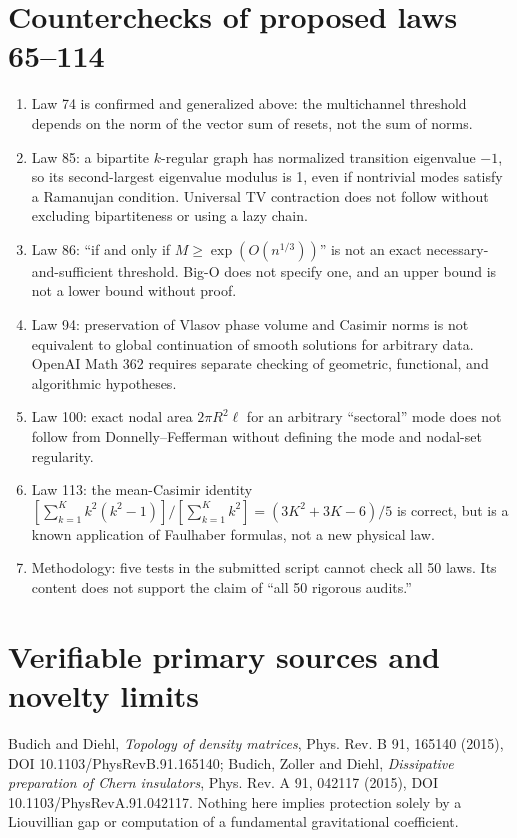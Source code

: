 \documentclass[11pt,a4paper,oneside]{book}
\begin{document}
\section{Counterchecks of proposed laws 65--114}
\begin{enumerate}
\item Law 74 is confirmed and generalized above: the multichannel threshold depends on the norm of the vector sum of resets, not the sum of norms.
\item Law 85: a bipartite $k$-regular graph has normalized transition eigenvalue $-1$, so its second-largest eigenvalue modulus is 1, even if nontrivial modes satisfy a Ramanujan condition. Universal TV contraction does not follow without excluding bipartiteness or using a lazy chain.
\item Law 86: ``if and only if $M\ge\exp(O(n^{1/3}))$'' is not an exact necessary-and-sufficient threshold. Big-O does not specify one, and an upper bound is not a lower bound without proof.
\item Law 94: preservation of Vlasov phase volume and Casimir norms is not equivalent to global continuation of smooth solutions for arbitrary data. OpenAI Math 362 requires separate checking of geometric, functional, and algorithmic hypotheses.
\item Law 100: exact nodal area $2\pi R^2\ell$ for an arbitrary ``sectoral'' mode does not follow from Donnelly--Fefferman without defining the mode and nodal-set regularity.
\item Law 113: the mean-Casimir identity $[\sum_{k=1}^Kk^2(k^2-1)]/[\sum_{k=1}^Kk^2]=(3K^2+3K-6)/5$ is correct, but is a known application of Faulhaber formulas, not a new physical law.
\item Methodology: five tests in the submitted script cannot check all 50 laws. Its content does not support the claim of ``all 50 rigorous audits.''
\end{enumerate}
\section{Verifiable primary sources and novelty limits}
Budich and Diehl, \emph{Topology of density matrices}, Phys. Rev. B 91, 165140 (2015), DOI 10.1103/PhysRevB.91.165140; Budich, Zoller and Diehl, \emph{Dissipative preparation of Chern insulators}, Phys. Rev. A 91, 042117 (2015), DOI 10.1103/PhysRevA.91.042117. Nothing here implies protection solely by a Liouvillian gap or computation of a fundamental gravitational coefficient.
\end{document}
